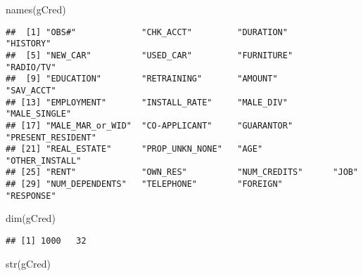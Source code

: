 \documentclass[
]{article}
\newenvironment{Shaded}{\begin{snugshade}}{\end{snugshade}}
\newcommand{\FunctionTok}[1]{\textcolor[rgb]{0.00,0.00,0.00}{#1}}
\newcommand{\NormalTok}[1]{#1}
\begin{document}
\begin{Shaded}
\begin{Highlighting}[]
\FunctionTok{names}\NormalTok{(gCred)}
\end{Highlighting}
\end{Shaded}

\begin{verbatim}
##  [1] "OBS#"             "CHK_ACCT"         "DURATION"         "HISTORY"         
##  [5] "NEW_CAR"          "USED_CAR"         "FURNITURE"        "RADIO/TV"        
##  [9] "EDUCATION"        "RETRAINING"       "AMOUNT"           "SAV_ACCT"        
## [13] "EMPLOYMENT"       "INSTALL_RATE"     "MALE_DIV"         "MALE_SINGLE"     
## [17] "MALE_MAR_or_WID"  "CO-APPLICANT"     "GUARANTOR"        "PRESENT_RESIDENT"
## [21] "REAL_ESTATE"      "PROP_UNKN_NONE"   "AGE"              "OTHER_INSTALL"   
## [25] "RENT"             "OWN_RES"          "NUM_CREDITS"      "JOB"             
## [29] "NUM_DEPENDENTS"   "TELEPHONE"        "FOREIGN"          "RESPONSE"
\end{verbatim}

\begin{Shaded}
\begin{Highlighting}[]
\FunctionTok{dim}\NormalTok{(gCred)}
\end{Highlighting}
\end{Shaded}

\begin{verbatim}
## [1] 1000   32
\end{verbatim}

\begin{Shaded}
\begin{Highlighting}[]
\FunctionTok{str}\NormalTok{(gCred)}
\end{Highlighting}
\end{Shaded}
\end{document}
